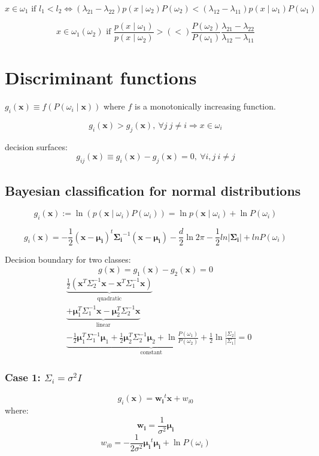 \documentclass{report}
\begin{document}
\[x \in \omega_1 \text{ if } l_1 < l_2 \Leftrightarrow (\lambda_{21}-\lambda_{22}) p(x \mid \omega_2)P(\omega_2) < (\lambda_{12}-\lambda_{11}) p(x \mid \omega_1)P(\omega_1)\]

\[x \in \omega_1 (\omega_2) \text{ if } \frac{p(x \mid \omega_1)}{p(x \mid \omega_2)} > (<) \frac{P(\omega_2)}{P(\omega_1)}\frac{\lambda_{21}-\lambda_{22}}{\lambda_{12}-\lambda_{11}}\]

\section{Discriminant functions}
$g_i (\symbf{x}) \equiv f(P(\omega_i \mid \symbf{x}))$ where $f$ is a monotonically increasing function.

\[g_i(\symbf{x}) > g_j(\symbf{x}),\ \forall j\ j \neq i \Rightarrow x \in \omega_i\]

decision surfaces:
\[g_{ij}(\symbf{x}) \equiv g_i(\symbf{x}) - g_j(\symbf{x}) = 0,\ \forall i, j\ i \neq j\]

\subsection*{Bayesian classification for normal distributions}

\[g_i(\symbf{x}) := \ln (p(\symbf{x} \mid \omega_i) P(\omega_i)) = \ln p(\symbf{x} \mid \omega_i) + \ln P(\omega_i)\]

\[g_i(\symbf{x}) = -\frac{1}{2} (\symbf{x} - \symbf{\mu_i})^t \symbf{\Sigma_i}^{-1} (\symbf{x} - \symbf{\mu_i}) - \frac{d}{2}\ln2\pi - \frac{1}{2} ln |\symbf{\Sigma_i}| + ln P(\omega_i)\]

Decision boundary for two classes:
\[g(\symbf{x}) = g_1(\symbf{x}) - g_2(\symbf{x}) = 0\]
\[\begin{split}
	&\underbrace{\frac{1}{2} \left( \symbf{x}^T \Sigma_2^{-1} \symbf{x} - \symbf{x}^T \Sigma_1^{-1} \symbf{x} \right)}_\text{quadratic} \\
	&\underbrace{+ \symbf{\mu}_1^T \Sigma_1^{-1} \symbf{x} - \symbf{\mu}_2^T \Sigma_2^{-1} \symbf{x}}_\text{linear} \\
	&\underbrace{- \frac{1}{2} \symbf{\mu}_1^T \Sigma_1^{-1} \symbf{\mu}_1 + \frac{1}{2} \symbf{\mu}_2^T \Sigma_2^{-1} \symbf{\mu}_2 + \ln \frac{P(\omega_1)}{P(\omega_2)} + \frac{1}{2} \ln \frac{|\Sigma_2|}{|\Sigma_1|}}_\text{constant} = 0
\end{split}\]

\subsubsection*{Case 1: $\Sigma_i = \sigma^2 I$}
\[g_i(\symbf{x}) = \symbf{w_i}^t \symbf{x} + w_{i0}\]
where:
\[\symbf{w_i} = \frac{1}{\sigma^{2}} \symbf{\mu_i}\]
\[w_{i0} = -\frac{1}{2\sigma^2}\symbf{\mu_i}^t \symbf{\mu_i} + \ln P(\omega_i) \]
\end{document}
